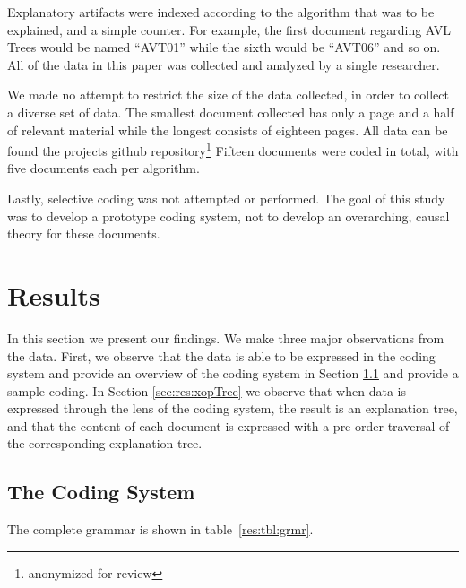 \documentclass[sigconf]{acmart}
\begin{document}
Explanatory artifacts were indexed according to the algorithm that was to be
explained, and a simple counter. For example, the first document regarding AVL
Trees would be named ``AVT01'' while the sixth would be ``AVT06'' and so on.
All of the data in this paper was collected and analyzed by a single researcher.

We made no attempt to restrict the size of the data collected, in order to
collect a diverse set of data. The smallest document collected has only a page
and a half of relevant material while the longest consists of eighteen pages.
All data can be found the projects github repository\footnote[1]{anonymized for
  review} Fifteen documents were coded in total, with five documents each per
algorithm.

Lastly, selective coding was not attempted or performed. The goal of this study
was to develop a prototype coding system, not to develop an overarching, causal
theory for these documents.

\section{Results}
In this section we present our findings. We make three major observations from
the data. First, we observe that the data is able to be expressed in the coding
system and provide an overview of the coding system in Section \ref{sec:res:sys}
and provide a sample coding. In Section \ref{sec:res:xopTree} we observe that
when data is expressed through the lens of the coding system, the result is an
explanation tree, and that the content of each document is expressed with a
pre-order traversal of the corresponding explanation tree.

\subsection{The Coding System}
\label{sec:res:sys}

The complete grammar is shown in table~\ref{res:tbl:grmr}.




\end{document}

